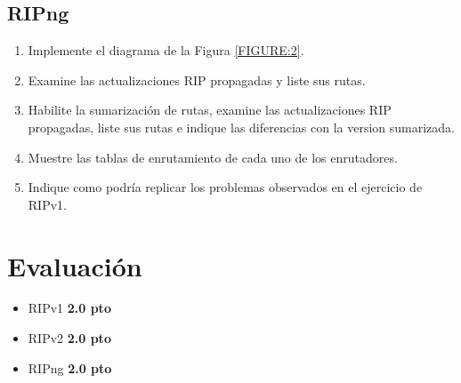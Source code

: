 \documentclass[11pt]{utalcaDoc}
\begin{document}
\subsection{RIPng}
\begin{enumerate}
  \item {Implemente el diagrama de la Figura \ref{FIGURE:2}.}
  \item Examine las actualizaciones RIP propagadas y liste sus rutas.
  \item Habilite la sumarización de rutas, examine las actualizaciones RIP propagadas, liste sus rutas e indique las diferencias con la version sumarizada.
  \item Muestre las tablas de enrutamiento de cada uno de los enrutadores.
  \item Indique como podría replicar los problemas observados en el ejercicio de RIPv1.
\end{enumerate}





\section{Evaluación}
\begin{itemize}
  \item{RIPv1 \textbf{2.0 pto}}
  \item{RIPv2 \textbf{2.0 pto}}
  \item{RIPng \textbf{2.0 pto}}
\end{itemize}
\end{document}
